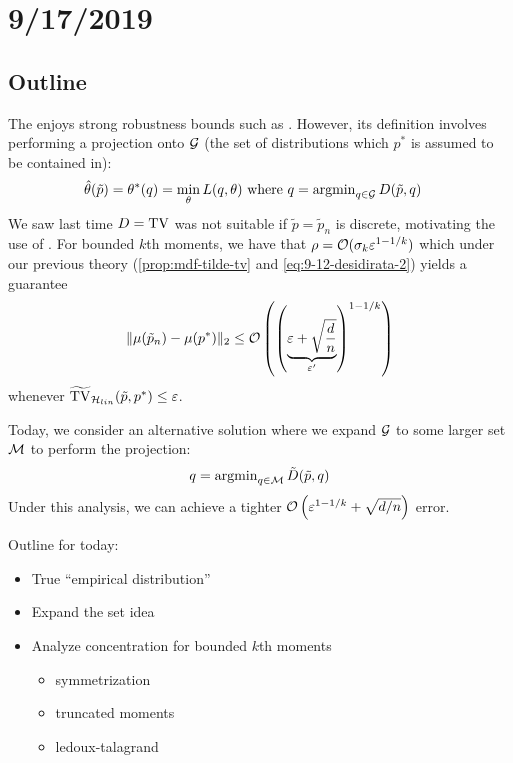 \section{9/17/2019}

\subsection{Outline}

The  enjoys strong robustness bounds such
as . However, its definition
involves performing a projection onto $\mathcal{G}$ (the set of distributions which
$p^*$ is assumed to be contained in):
\begin{align}
  \hat\theta(\tilde{p}) &= \theta^*(q) = \min_\theta L(q,\theta)
  \text{ where }q = \operatorname{argmin}_{q \in \mathcal{G}} D(\tilde{p}, q)
\end{align}
We saw last time $D=\operatorname{TV}$ was not suitable if $\tilde{p} = \tilde{p}_n$ is discrete,
motivating the use of .
For bounded $k$th moments, we have that $\rho = \mathcal{O}(\sigma_k \varepsilon^{1 - 1/k})$
which under our previous theory (\cref{prop:mdf-tilde-tv} and \cref{eq:9-12-desidirata-2})
yields a guarantee
\begin{align}
  \|\mu(\tilde{p}_n) - \mu(p^*)\|_2 \leq \mathcal{O}\left( \left(\underbrace{\varepsilon + \sqrt{\frac{d}{n}}}_{\varepsilon'}\right)^{1 - 1/k}\right)
\end{align}
whenever $\widetilde{\operatorname{TV}}_{\mathcal{H}_{lin}}(\tilde{p}, p^*) \leq \varepsilon$.

Today, we consider an alternative solution where we expand $\mathcal{G}$ to some
larger set $\mathcal{M}$ to perform the projection:
\begin{align}
  q = \operatorname{argmin}_{q \in \mathcal{M}} \tilde{D}(\tilde{p}, q)
\end{align}
Under this analysis, we can achieve a tighter $\mathcal{O}\left(\varepsilon^{1 - 1/k} + \sqrt{d/n}\right)$ error.

Outline for today:
\begin{itemize}
  \item True ``empirical distribution''
  \item Expand the set idea
  \item Analyze concentration for bounded $k$th moments
    \begin{itemize}
      \item symmetrization
      \item truncated moments
      \item ledoux-talagrand
    \end{itemize}
\end{itemize}

